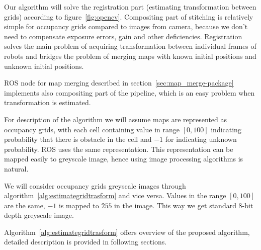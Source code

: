 Our algorithm will solve the registration part (estimating transformation between grids) according to figure~\ref{fig:opencv}. Compositing part of stitching is relatively simple for occupancy grids compared to images from camera, because we don't need to compensate exposure errors, gain and other deficiencies. Registration solves the main problem of acquiring transformation between individual frames of robots and bridges the problem of merging maps with known initial positions and unknown initial positions.

\gls{ROS} node for map merging described in section~\ref{sec:map_merge-package} implements also compositing part of the pipeline, which is an easy problem when transformation is estimated.

For description of the algorithm we will assume maps are represented as occupancy grids, with each cell containing value in range $[0,100]$ indicating probability that there is obstacle in the cell and $-1$ for indicating unknown probability. \gls{ROS} uses the same representation. This representation can be mapped easily to greyscale image, hence using image processing algorithms is natural.

We will consider occupancy grids greyscale images through algorithm~\ref{alg:estimategridtrasform} and vice versa. Values in the range $[0,100]$ are the same, $-1$ is mapped to $255$ in the image. This way we get standard $8$-bit depth greyscale image.

Algorithm~\ref{alg:estimategridtrasform} offers overview of the proposed algorithm, detailed description is provided in following sections.

